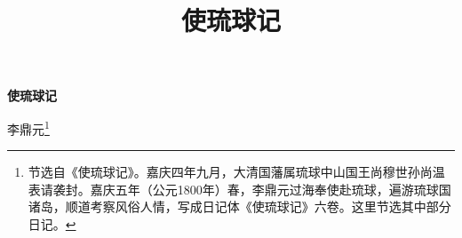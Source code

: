 \documentclass[12pt,UTF-8,openany]{ctexbook}
\title{\zihao{0} \bfseries 使琉球记}
\author{}
\date{}
\begin{document}


\begin{center}
    \begin{Huge}
        \textbf{使琉球记}
    \end{Huge}
    
    \vspace{8pt}
    李鼎元\footnote{节选自《使琉球记》。嘉庆四年九月，大清国藩属琉球中山国王尚穆世孙尚温表请袭封。嘉庆五年（公元1800年）春，李鼎元过海奉使赴琉球，遍游琉球国诸岛，顺道考察风俗人情，写成日记体《使琉球记》六卷。这里节选其中部分日记。}
    \vspace{8pt}
\end{center}
\end{document}
